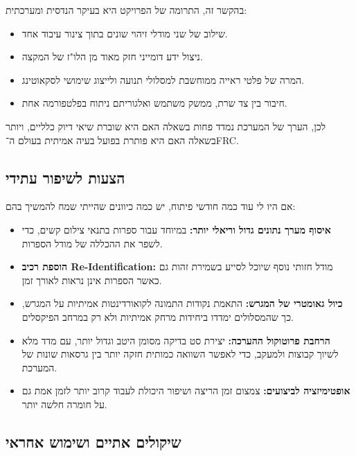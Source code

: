 בהקשר זה, התרומה של הפרויקט היא בעיקר הנדסית ומערכתית:

\begin{itemize}
\item שילוב של שני מודלי זיהוי שונים בתוך צינור עיבוד אחד.
\item ניצול ידע דומייני חזק מאוד מן הלו"ז של המקצה.
\item המרה של פלטי ראייה ממוחשבת למסלולי תנועה ולייצוג שימושי לסקאוטינג.
\item חיבור בין צד שרת, ממשק משתמש ואלגוריתם ניתוח בפלטפורמה אחת.
\end{itemize}

לכן, הערך של המערכת נמדד פחות בשאלה האם היא שוברת שיאי דיוק כלליים,
ויותר בשאלה האם היא פותרת בפועל בעיה אמיתית בעולם ה־\textenglish{FRC}.

\subsection{הצעות לשיפור עתידי}

אם היו לי עוד כמה חודשי פיתוח, יש כמה כיוונים שהייתי שמח להמשיך בהם:

\begin{itemize}
\item \textbf{איסוף מערך נתונים גדול וריאלי יותר:} במיוחד עבור ספרות
  בתנאי צילום קשים, כדי לשפר את ההכללה של מודל הספרות.

\item \textbf{הוספת רכיב \textenglish{Re-Identification}:} מודל חזותי
  נוסף שיוכל לסייע בשמירת זהות גם כאשר הספרות אינן נראות לאורך זמן.

\item \textbf{כיול גאומטרי של המגרש:} התאמת נקודות התמונה לקואורדינטות
  אמיתיות על המגרש, כך שהמסלולים ימדדו ביחידות מרחק אמיתיות ולא רק
  במרחב הפיקסלים.

\item \textbf{הרחבת פרוטוקול ההערכה:} יצירת סט בדיקה מסומן היטב וגדול
  יותר, עם מדד מלא לשיוך קבוצות ולמעקב, כדי לאפשר השוואה כמותית חזקה
  יותר בין גרסאות שונות של המערכת.
  
\item \textbf{אופטימיזציה לביצועים:} צמצום זמן הריצה ושיפור היכולת
  לעבוד קרוב יותר לזמן אמת גם על חומרה חלשה יותר.
\end{itemize}

\subsection{שיקולים אתיים ושימוש אחראי}

